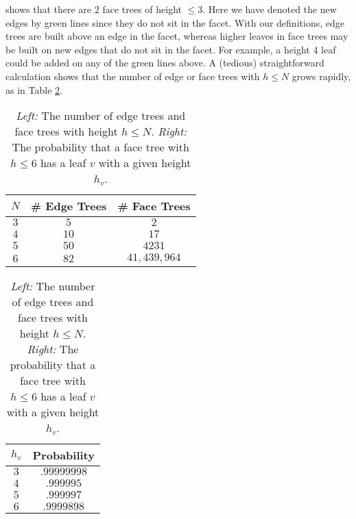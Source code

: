 \documentclass[aps,prl,twocolumn, superscriptaddress,groupedaddress,nofootinbib]{revtex4-1}
\begin{document}
shows that there are $2$ face trees of height $\leq 3$. Here we have denoted the new edges by green lines since they do
not sit in the facet. With our definitions, edge trees are built above an edge
in the facet, whereas higher leaves in face trees may be built on new edges
that do not sit in the facet. For example, a height $4$ leaf could be added
on any of the green lines above. A (tedious) straightforward calculation shows that the number of
edge or face trees with $h \leq N$ grows rapidly, as in
Table \ref{tab:numedgefacetreeandprob}.%
\begin{table}
\begin{tabular}{|c|c|c|}
\hline
$N$ & \# Edge Trees & \# Face Trees \\ \hline
$3$ & $5$ & $2$\\
$4$ & $10$ & $17$\\
$5$ & $50$ & $4231$ \\
$6$ & $82$ & $41,439,964$\\ \hline
\end{tabular} \hspace{1cm}
\begin{tabular}{|c|c|}
\hline
$h_v$ & Probability \\ \hline
$3$ & $.99999998$ \\
$4$ & $.999995$ \\
$5$ & $.999997$  \\
$6$ & $.9999898$ \\ \hline
\end{tabular}
\caption{\emph{Left:} The number of edge trees and face trees with height $h\leq N$.
\emph{Right:} The probability that a face tree with $h\leq 6$ has a leaf $v$ with
a given height $h_v$.}
\label{tab:numedgefacetreeandprob}
\end{table}

\end{document}
